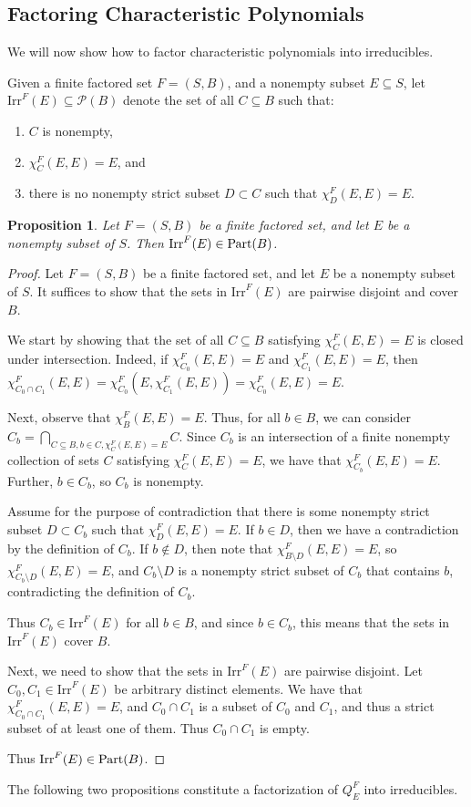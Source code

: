 \documentclass[authordate,onecolumn]{miri-tech-article}
\newtheorem{proposition}{Proposition}
\begin{document}
\subsection{Factoring Characteristic Polynomials}
We will now show how to factor characteristic polynomials into irreducibles. 
\begin{definition}
Given a finite factored set $F=(S,B)$, and a nonempty subset $E\subseteq S$, let $\text{Irr}^F(E)\subseteq\mathcal{P}(B)$ denote the set of all $C\subseteq B$ such that:
\begin{enumerate}
    \item $C$ is nonempty,
    \item $\chi^F_C(E,E)=E$, and
    \item there is no nonempty strict subset $D\subset C$ such that $\chi^F_D(E,E)=E$.
\end{enumerate}
\end{definition}

\begin{proposition}
Let $F=(S,B)$ be a finite factored set, and let $E$ be a nonempty subset of $S$. Then $\text{Irr}^F(E)\in\parts[B]$.
\end{proposition}
\begin{proof}
Let $F=(S,B)$ be a finite factored set, and let $E$ be a nonempty subset of $S$. It suffices to show that the sets in $\text{Irr}^F(E)$ are pairwise disjoint and cover $B$. 

We start by showing that the set of all $C\subseteq B$ satisfying $\chi^F_C(E,E)=E$ is closed under intersection. Indeed, if $\chi^F_{C_0}(E,E)=E$ and $\chi^F_{C_1}(E,E)=E$, then $\chi^F_{C_0\cap C_1}(E,E)=\chi^F_{C_0}(E,\chi^F_{C_1}(E,E))=\chi^F_{C_0}(E,E)=E$.

Next, observe that $\chi^F_B(E,E)=E$. Thus, for all $b\in B$, we can consider $C_b=\bigcap_{C\subseteq B,b\in C,\chi^F_C(E,E)=E}C$. Since $C_b$ is an intersection of a finite nonempty collection of sets $C$ satisfying  $\chi^F_C(E,E)=E$, we have that $\chi^F_{C_b}(E,E)=E$. Further, $b\in C_b$, so $C_b$ is nonempty.

Assume for the purpose of contradiction that there is some nonempty strict subset $D\subset C_b$ such that $\chi^F_{D}(E,E)=E$. If $b\in D$, then we have a contradiction by the definition of $C_b$. If $b\notin D$, then note that $\chi^F_{B\setminus D}(E,E)=E$, so  $\chi^F_{C_b\setminus D}(E,E)=E$, and $C_b\setminus D$ is a nonempty strict subset of $C_b$ that contains $b$, contradicting the definition of $C_b$.

Thus $C_b\in \text{Irr}^F(E)$ for all $b\in B$, and since $b\in C_b$, this means that the sets in $\text{Irr}^F(E)$ cover $B$.

Next, we need to show that the sets in $\text{Irr}^F(E)$ are pairwise disjoint. Let $C_0,C_1\in \text{Irr}^F(E)$ be arbitrary distinct elements. We have that $\chi^F_{C_0\cap C_1}(E,E)=E$, and $C_0\cap C_1$ is a subset of $C_0$ and $C_1$, and thus a strict subset of at least one of them. Thus $C_0\cap C_1$ is empty.

Thus $\text{Irr}^F(E)\in\parts[B]$.
\end{proof}
The following two propositions constitute a factorization of $Q^F_E$ into irreducibles.
\end{document}
